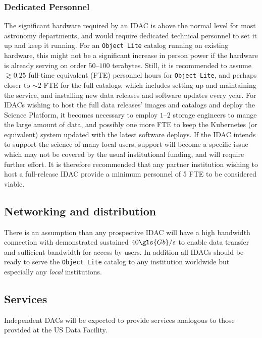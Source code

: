 \subsubsection{Dedicated Personnel}
The significant hardware required by an \gls{IDAC} is above the normal level for most astronomy departments, and would require dedicated technical personnel to set it up and keep it running. For an {\tt Object Lite} catalog running on existing hardware, this might not be a significant increase in person power if the hardware is already serving on order $50$--$100$ terabytes. Still, it is recommended to assume $\gtrsim0.25$ full-time equivalent (\gls{FTE}) personnel hours for {\tt Object Lite}, and perhaps closer to $\sim2$ \gls{FTE} for the full catalogs, which includes setting up and maintaining the service, and installing new data releases and software updates every year. For IDACs wishing to host the full data releases' images and catalogs and deploy the \RO \gls{Science Platform}, it becomes necessary to employ $1$--$2$ storage engineers to mange the large amount of data, and possibly one more \gls{FTE} to keep the \gls{Kubernetes} (or equivalent) system updated with the latest software deploys. If the \gls{IDAC} intends to support the science of many local users, support will become a specific issue which may not be covered by the usual institutional funding, and will require further effort. It is therefore recommended that any partner institution wishing to host a full-release \gls{IDAC} provide a minimum personnel of 5 \gls{FTE} to be considered viable.

\subsection{Networking and distribution}
There is an assumption than any prospective \gls{IDAC} will have a high bandwidth connection with demonstrated sustained $40 \gls{Gb}/s$ to enable data transfer and sufficient bandwidth for access by users.
In addition all IDACs should be ready  to serve the {\tt \gls{Object} Lite} catalog to any institution worldwide but especially any {\em local} institutions.

\subsection{Services}

Independent DACs will be expected to provide services analogous to those provided at the \gls{US} Data Facility.

